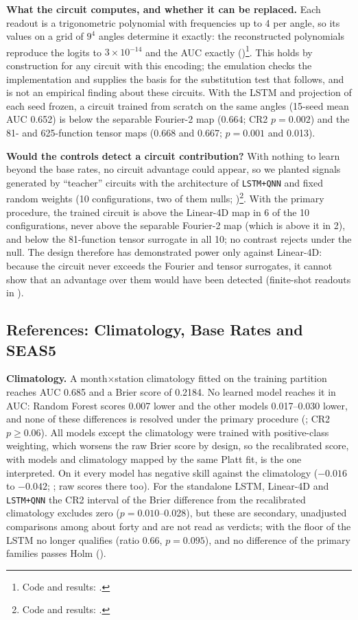\documentclass[11pt,a4paper]{article}
\begin{document}
\textbf{What the circuit computes, and whether it can be replaced.} Each readout is a trigonometric polynomial with frequencies up to 4 per angle, so its values on a grid of $9^4$ angles determine it exactly: the reconstructed polynomials reproduce the logits to $3\times10^{-14}$ and the AUC exactly ()\footnote{Code and results: .}. This holds by construction for any circuit with this encoding; the emulation checks the implementation and supplies the basis for the substitution test that follows, and is not an empirical finding about these circuits. With the LSTM and projection of each seed frozen, a circuit trained from scratch on the same angles (15-seed mean AUC 0.652) is below the separable Fourier-2 map (0.664; CR2 $p=0.002$) and the 81- and 625-function tensor maps (0.668 and 0.667; $p=0.001$ and 0.013).

\textbf{Would the controls detect a circuit contribution?} With nothing to learn beyond the base rates, no circuit advantage could appear, so we planted signals generated by ``teacher'' circuits with the architecture of \texttt{LSTM+QNN} and fixed random weights (10 configurations, two of them nulls; )\footnote{Code and results: .}. With the primary procedure, the trained circuit is above the Linear-4D map in 6 of the 10 configurations, never above the separable Fourier-2 map (which is above it in 2), and below the 81-function tensor surrogate in all 10; no contrast rejects under the null. The design therefore has demonstrated power only against Linear-4D: because the circuit never exceeds the Fourier and tensor surrogates, it cannot show that an advantage over them would have been detected (finite-shot readouts in ).

\subsection{References: Climatology, Base Rates and SEAS5}
\label{sec:reference}

\textbf{Climatology.} A month$\times$station climatology fitted on the training partition reaches AUC 0.685 and a Brier score of 0.2184. No learned model reaches it in AUC: Random Forest scores 0.007 lower and the other models 0.017--0.030 lower, and none of these differences is resolved under the primary procedure (; CR2 $p\ge0.06$). All models except the climatology were trained with positive-class weighting, which worsens the raw Brier score by design, so the recalibrated score, with models and climatology mapped by the same Platt fit, is the one interpreted. On it every model has negative skill against the climatology ($-0.016$ to $-0.042$; ; raw scores there too). For the standalone LSTM, Linear-4D and \texttt{LSTM+QNN} the CR2 interval of the Brier difference from the recalibrated climatology excludes zero ($p=0.010$--0.028), but these are secondary, unadjusted comparisons among about forty and are not read as verdicts; with the floor of  the LSTM no longer qualifies (ratio 0.66, $p=0.095$), and no difference of the primary families passes Holm ().
\end{document}
